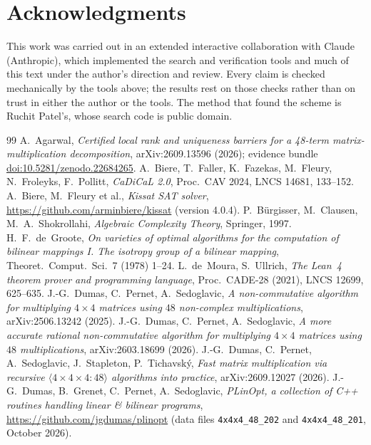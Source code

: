 \documentclass[11pt]{article}
\theoremstyle{remark}
\begin{document}
\section*{Acknowledgments}

This work was carried out in an extended interactive collaboration
with Claude (Anthropic), which implemented the search and verification
tools and much of this text under the author's direction and review.
Every claim is checked mechanically by the tools above; the results
rest on those checks rather than on trust in either the author or the
tools.  The method that found the scheme is Ruchit Patel's, whose
search code is public domain.

\begin{thebibliography}{99}
 A.~Agarwal, \emph{Certified local rank and
uniqueness barriers for a 48-term matrix-multiplication decomposition},
arXiv:2609.13596 (2026); evidence bundle
\href{https://doi.org/10.5281/zenodo.22684265}{doi:10.5281/zenodo.22684265}.
 A.~Biere, T.~Faller, K.~Fazekas, M.~Fleury,
N.~Froleyks, F.~Pollitt, \emph{CaDiCaL 2.0}, Proc.\ CAV 2024, LNCS
14681, 133--152.
 A.~Biere, M.~Fleury et al., \emph{Kissat SAT solver},
\url{https://github.com/arminbiere/kissat} (version 4.0.4).
 P.~B\"urgisser, M.~Clausen, M.~A.~Shokrollahi,
\emph{Algebraic Complexity Theory}, Springer, 1997.
 H.~F.~de~Groote, \emph{On varieties of optimal
algorithms for the computation of bilinear mappings I. The isotropy
group of a bilinear mapping}, Theoret.\ Comput.\ Sci.\ 7 (1978) 1--24.
 L.~de~Moura, S.~Ullrich, \emph{The Lean~4 theorem prover
and programming language}, Proc.\ CADE-28 (2021), LNCS 12699, 625--635.
 J.-G.~Dumas, C.~Pernet, A.~Sedoglavic, \emph{A
non-commutative algorithm for multiplying $4\times4$ matrices using
$48$ non-complex multiplications}, arXiv:2506.13242 (2025).
 J.-G.~Dumas, C.~Pernet, A.~Sedoglavic, \emph{A more
accurate rational non-commutative algorithm for multiplying $4\times4$
matrices using $48$ multiplications}, arXiv:2603.18699 (2026).
 J.-G.~Dumas, C.~Pernet, A.~Sedoglavic, J.~Stapleton,
P.~Tichavsk\'y, \emph{Fast matrix multiplication via recursive
$\langle4\times4\times4:48\rangle$ algorithms into practice},
arXiv:2609.12027 (2026).
 J.-G.~Dumas, B.~Grenet, C.~Pernet, A.~Sedoglavic,
\emph{PLinOpt, a collection of C++ routines handling linear \&
bilinear programs}, \url{https://github.com/jgdumas/plinopt} (data
files \texttt{4x4x4\_48\_202} and \texttt{4x4x4\_48\_201}, October 2026).

\end{thebibliography}
\end{document}
